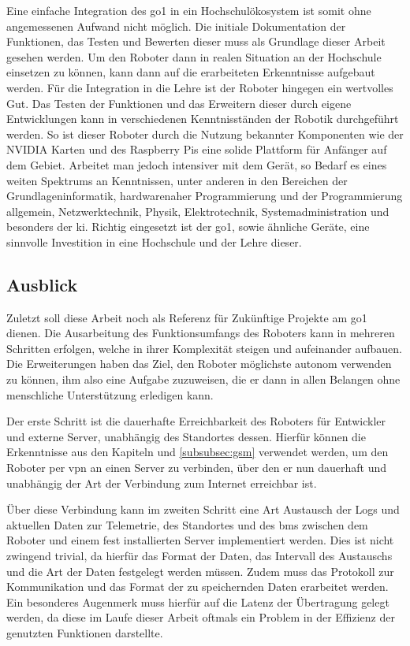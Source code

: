 Eine einfache Integration des \gls{go1} in ein Hochschulökosystem ist somit ohne angemessenen Aufwand nicht möglich.
Die initiale Dokumentation der Funktionen, das Testen und Bewerten dieser muss als Grundlage dieser Arbeit gesehen werden.
Um den Roboter dann in realen Situation an der Hochschule einsetzen zu können, kann dann auf die erarbeiteten Erkenntnisse
aufgebaut werden.
Für die Integration in die Lehre ist der Roboter hingegen ein wertvolles Gut.
Das Testen der Funktionen und das Erweitern dieser durch eigene Entwicklungen kann in verschiedenen Kenntnisständen der
Robotik durchgeführt werden.
So ist dieser Roboter durch die Nutzung bekannter Komponenten wie der NVIDIA Karten und des Raspberry Pis eine solide Plattform
für Anfänger auf dem Gebiet.
Arbeitet man jedoch intensiver mit dem Gerät, so Bedarf es eines weiten Spektrums an Kenntnissen, unter anderen in den Bereichen
der Grundlageninformatik, hardwarenaher Programmierung und der Programmierung allgemein, Netzwerktechnik, Physik, Elektrotechnik,
Systemadministration und besonders der \gls{ki}.
Richtig eingesetzt ist der \gls{go1}, sowie ähnliche Geräte, eine sinnvolle Investition in eine Hochschule und der Lehre dieser.


\subsection{Ausblick}
\label{subsec:ausblick}

Zuletzt soll diese Arbeit noch als Referenz für Zukünftige Projekte am \gls{go1} dienen.
Die Ausarbeitung des Funktionsumfangs des Roboters kann in mehreren Schritten erfolgen, welche in ihrer Komplexität
steigen und aufeinander aufbauen.
Die Erweiterungen haben das Ziel, den Roboter möglichste autonom verwenden zu können, ihm also eine Aufgabe zuzuweisen,
die er dann in allen Belangen ohne menschliche Unterstützung erledigen kann.

Der erste Schritt ist die dauerhafte Erreichbarkeit des Roboters für Entwickler und externe Server, unabhängig des Standortes
dessen.
Hierfür können die Erkenntnisse aus den Kapiteln  und \ref{subsubsec:gsm} verwendet werden, um
den Roboter per \gls{vpn} an einen Server zu verbinden, über den er nun dauerhaft und unabhängig der Art der Verbindung zum Internet
erreichbar ist.

Über diese Verbindung kann im zweiten Schritt eine Art Austausch der Logs und aktuellen Daten zur Telemetrie, des Standortes und
des \gls{bms} zwischen dem Roboter und einem fest installierten Server implementiert werden.
Dies ist nicht zwingend trivial, da hierfür das Format der Daten, das Intervall des Austauschs und die Art der Daten festgelegt werden
müssen.
Zudem muss das Protokoll zur Kommunikation und das Format der zu speichernden Daten erarbeitet werden.
Ein besonderes Augenmerk muss hierfür auf die Latenz der Übertragung gelegt werden, da diese im Laufe dieser Arbeit
oftmals ein Problem in der Effizienz der genutzten Funktionen darstellte.

